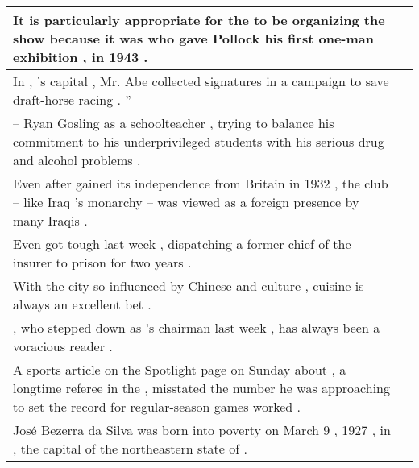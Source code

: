 \begin{table}
\begin{tabular}{p{} P{1,3cm} }
\hline
{} {It is particularly appropriate for the \underline{} to be organizing the show because it was \underline{} who gave Pollock his first one-man exhibition , in 1943 .} &    \\ 
\hline
{} {In \underline{} , \underline{} 's capital , Mr. Abe collected signatures in a campaign to save draft-horse racing . ''} &    \\ 
\hline
{} {\underline{} -- Ryan Gosling as a \underline{} schoolteacher , trying to balance his commitment to his underprivileged students with his serious drug and alcohol problems .} &    \\ 
\hline
{} {Even after \underline{} gained its independence from Britain in 1932 , the club -- like Iraq 's \underline{} monarchy -- was viewed as a foreign presence by many Iraqis .} &    \\ 
\hline
{} {Even \underline{} got tough last week , dispatching a former chief of the insurer \underline{} to prison for two years .} &    \\ 
\hline
{} {With the city so influenced by Chinese and \underline{} culture , \underline{} cuisine is always an excellent bet .} &    \\ 
\hline
{} {\underline{} , who stepped down as \underline{} 's chairman last week , has always been a voracious reader .} &    \\ 
\hline
{} {A sports article on the Spotlight page on Sunday about \underline{} , a longtime referee in the \underline{} , misstated the number he was approaching to set the record for regular-season games worked .} &    \\ 
\hline
{} {José Bezerra da Silva was born into poverty on March 9 , 1927 , in \underline{} , the capital of the northeastern state of \underline{} .} &    \\ 

\end{tabular}
\end{table}
